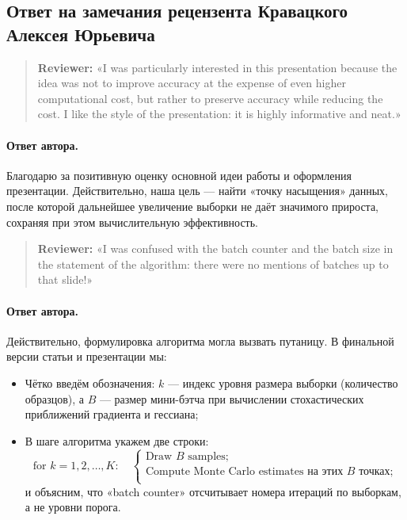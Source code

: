 \documentclass[11pt]{article}
\begin{document}
\pagestyle{empty}

\begin{center}
    \subsection*{Ответ на замечания рецензента Кравацкого Алексея Юрьевича}
\end{center}

\begin{quote}
    \textbf{Reviewer:}
    «I was particularly interested in this presentation because the idea was not to improve accuracy at the expense of even higher computational cost, but rather to preserve accuracy while reducing the cost.
    I like the style of the presentation: it is highly informative and neat.»
\end{quote}

\paragraph{Ответ автора.}
Благодарю за позитивную оценку основной идеи работы и оформления презентации. Действительно, наша цель — найти «точку насыщения» данных, после которой дальнейшее увеличение выборки не даёт значимого прироста, сохраняя при этом вычислительную эффективность.

\begin{quote}
    \textbf{Reviewer:}
    «I was confused with the batch counter and the batch size in the statement of the algorithm: there were no mentions of batches up to that slide!»
\end{quote}

\paragraph{Ответ автора.}
Действительно, формулировка алгоритма могла вызвать путаницу. В финальной версии статьи и презентации мы:
\begin{itemize}
    \item Чётко введём обозначения: \(k\) — индекс уровня размера выборки (количество образцов), а \(B\) — размер мини-бэтча при вычислении стохастических приближений градиента и гессиана;
    \item В шаге алгоритма укажем две строки:
          \[
              \text{for } k = 1,2,\dots,K:\quad
              \begin{cases}
                  \text{Draw } B \text{ samples;}                               \\
                  \text{Compute Monte Carlo estimates на этих }B\text{ точках;} \\
              \end{cases}
          \]
          и объясним, что «batch counter» отсчитывает номера итераций по выборкам, а не уровни порога.
\end{itemize}
\end{document}
